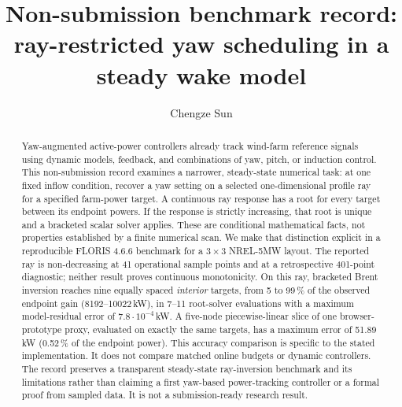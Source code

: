 \documentclass[wes, manuscript]{copernicus}
\begin{document}
\title{Non-submission benchmark record: ray-restricted yaw scheduling in a steady wake model}
\author[1]{Chengze Sun}
\received{}
\pubdiscuss{}
\revised{}
\accepted{}
\published{}
\maketitle

\begin{abstract}
Yaw-augmented active-power controllers already track wind-farm reference signals using dynamic models, feedback, and combinations of yaw, pitch, or induction control. This non-submission record examines a narrower, steady-state numerical task: at one fixed inflow condition, recover a yaw setting on a selected one-dimensional profile ray for a specified farm-power target. A continuous ray response has a root for every target between its endpoint powers. If the response is strictly increasing, that root is unique and a bracketed scalar solver applies. These are conditional mathematical facts, not properties established by a finite numerical scan. We make that distinction explicit in a reproducible FLORIS 4.6.6 benchmark for a $3\times3$ NREL-5MW layout. The reported ray is non-decreasing at 41 operational sample points and at a retrospective 401-point diagnostic; neither result proves continuous monotonicity. On this ray, bracketed Brent inversion reaches nine equally spaced \emph{interior} targets, from 5 to 99\,\% of the observed endpoint gain (8192--10022\,kW), in 7--11 root-solver evaluations with a maximum model-residual error of $7.8\cdot10^{-4}$\,kW. A five-node piecewise-linear slice of one browser-prototype proxy, evaluated on exactly the same targets, has a maximum error of 51.89\,kW (0.52\,\% of the endpoint power). This accuracy comparison is specific to the stated implementation. It does not compare matched online budgets or dynamic controllers. The record preserves a transparent steady-state ray-inversion benchmark and its limitations rather than claiming a first yaw-based power-tracking controller or a formal proof from sampled data. It is not a submission-ready research result.
\end{abstract}

\introduction
\label{sec:intro}
\end{document}
